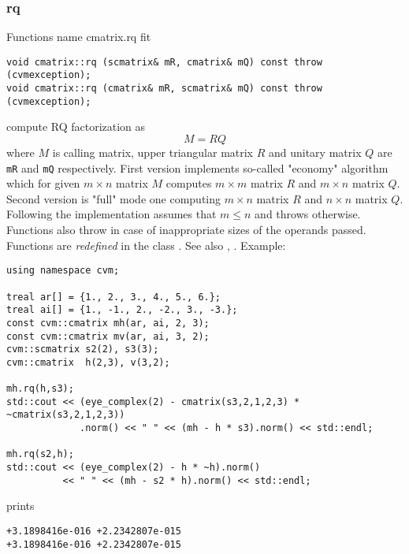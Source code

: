 \subsubsection{rq}
Functions%
\pdfdest name {cmatrix.rq} fit
\begin{verbatim}
void cmatrix::rq (scmatrix& mR, cmatrix& mQ) const throw (cvmexception);
void cmatrix::rq (cmatrix& mR, scmatrix& mQ) const throw (cvmexception);
\end{verbatim}
compute RQ factorization as
\begin{equation*}
M=RQ
\end{equation*}
where 
$M$ is  calling matrix, upper triangular matrix $R$
and unitary matrix $Q$ are \verb"mR" and \verb"mQ"
respectively. First version implements so-called "economy" algorithm
which for  given $m\times n$ matrix $M$ computes $m\times m$ matrix $R$
and $m\times n$ matrix $Q$. Second version is  "full" mode one
computing $m\times n$ matrix $R$ and $n\times n$ matrix $Q$.
Following 
the implementation assumes that $m\le n$ and throws 
otherwise.
Functions also throw
in case of inappropriate sizes of the operands passed.
Functions are \emph{redefined} in the class
.
See also ,
.
Example:
\begin{Verbatim}
using namespace cvm;

treal ar[] = {1., 2., 3., 4., 5., 6.};
treal ai[] = {1., -1., 2., -2., 3., -3.};
const cvm::cmatrix mh(ar, ai, 2, 3);
const cvm::cmatrix mv(ar, ai, 3, 2);
cvm::scmatrix s2(2), s3(3);
cvm::cmatrix  h(2,3), v(3,2);

mh.rq(h,s3);
std::cout << (eye_complex(2) - cmatrix(s3,2,1,2,3) * ~cmatrix(s3,2,1,2,3))
             .norm() << " " << (mh - h * s3).norm() << std::endl;

mh.rq(s2,h);
std::cout << (eye_complex(2) - h * ~h).norm()
          << " " << (mh - s2 * h).norm() << std::endl;
\end{Verbatim}
prints
\begin{Verbatim}
+3.1898416e-016 +2.2342807e-015
+3.1898416e-016 +2.2342807e-015
\end{Verbatim}
\newpage



